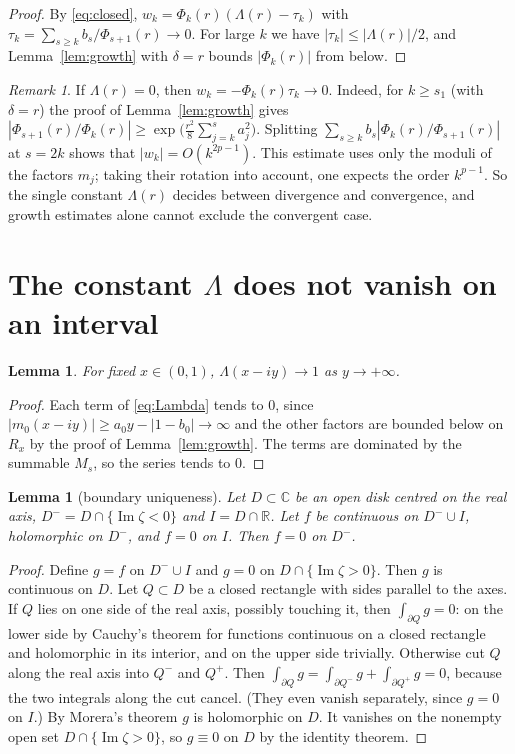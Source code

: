 \documentclass[11pt]{amsart}
\newtheorem{lemma}[theorem]{Lemma}
\theoremstyle{remark}
\newtheorem{remark}[theorem]{Remark}
\newcommand{\R}{\mathbb{R}}
\newcommand{\C}{\mathbb{C}}
\newcommand{\im}{\operatorname{Im}}
\begin{document}
\begin{proof}
By \eqref{eq:closed}, $w_k=\Phi_k(r)(\Lambda(r)-\tau_k)$ with $\tau_k=\sum_{s\ge k}b_s/\Phi_{s+1}(r)\to0$.
For large $k$ we have $|\tau_k|\le|\Lambda(r)|/2$, and Lemma~\ref{lem:growth} with $\delta=r$ bounds $|\Phi_k(r)|$ from below.
\end{proof}

\begin{remark}\label{rem:convergent}
If $\Lambda(r)=0$, then $w_k=-\Phi_k(r)\tau_k\to0$.
Indeed, for $k\ge s_1$ (with $\delta=r$) the proof of Lemma~\ref{lem:growth} gives $|\Phi_{s+1}(r)/\Phi_k(r)|\ge\exp\bigl(\tfrac{r^2}{8}\sum_{j=k}^{s}a_j^2\bigr)$.
Splitting $\sum_{s\ge k}b_s|\Phi_k(r)/\Phi_{s+1}(r)|$ at $s=2k$ shows that $|w_k|=O(k^{2p-1})$.
This estimate uses only the moduli of the factors $m_j$; taking their rotation into account, one expects the order $k^{p-1}$.
So the single constant $\Lambda(r)$ decides between divergence and convergence, and growth estimates alone cannot exclude the convergent case.
\end{remark}

\section{The constant $\Lambda$ does not vanish on an interval}

\begin{lemma}\label{lem:limit}
For fixed $x\in(0,1)$, $\Lambda(x-iy)\to1$ as $y\to+\infty$.
\end{lemma}

\begin{proof}
Each term of \eqref{eq:Lambda} tends to $0$, since $|m_0(x-iy)|\ge a_0y-|1-b_0|\to\infty$ and the other factors are bounded below on $R_x$ by the proof of Lemma~\ref{lem:growth}.
The terms are dominated by the summable $M_s$, so the series tends to $0$.
\end{proof}

\begin{lemma}[boundary uniqueness]\label{lem:unique}
Let $D\subset\C$ be an open disk centred on the real axis, $D^-=D\cap\{\im\zeta<0\}$ and $I=D\cap\R$.
Let $f$ be continuous on $D^-\cup I$, holomorphic on $D^-$, and $f=0$ on $I$.
Then $f=0$ on $D^-$.
\end{lemma}

\begin{proof}
Define $g=f$ on $D^-\cup I$ and $g=0$ on $D\cap\{\im\zeta>0\}$.
Then $g$ is continuous on $D$.
Let $Q\subset D$ be a closed rectangle with sides parallel to the axes.
If $Q$ lies on one side of the real axis, possibly touching it, then $\int_{\partial Q}g=0$: on the lower side by Cauchy's theorem for functions continuous on a closed rectangle and holomorphic in its interior, and on the upper side trivially.
Otherwise cut $Q$ along the real axis into $Q^-$ and $Q^+$.
Then $\int_{\partial Q}g=\int_{\partial Q^-}g+\int_{\partial Q^+}g=0$, because the two integrals along the cut cancel.
(They even vanish separately, since $g=0$ on $I$.)
By Morera's theorem $g$ is holomorphic on $D$.
It vanishes on the nonempty open set $D\cap\{\im\zeta>0\}$, so $g\equiv0$ on $D$ by the identity theorem.
\end{proof}
\end{document}
